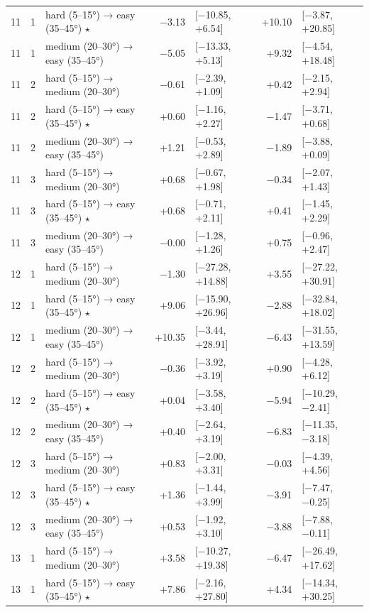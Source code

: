 \begin{table}[htbp]
\begin{tabular}{rllrlrl}
    11 & 1 & hard (5–15°) → easy (35–45°) $\star$ & −3.13 & [−10.85, +6.54] & +10.10 & [−3.87, +20.85] \\
    11 & 1 & medium (20–30°) → easy (35–45°) & −5.05 & [−13.33, +5.13] & +9.32 & [−4.54, +18.48] \\
    11 & 2 & hard (5–15°) → medium (20–30°) & −0.61 & [−2.39, +1.09] & +0.42 & [−2.15, +2.94] \\
    11 & 2 & hard (5–15°) → easy (35–45°) $\star$ & +0.60 & [−1.16, +2.27] & −1.47 & [−3.71, +0.68] \\
    11 & 2 & medium (20–30°) → easy (35–45°) & +1.21 & [−0.53, +2.89] & −1.89 & [−3.88, +0.09] \\
    11 & 3 & hard (5–15°) → medium (20–30°) & +0.68 & [−0.67, +1.98] & −0.34 & [−2.07, +1.43] \\
    11 & 3 & hard (5–15°) → easy (35–45°) $\star$ & +0.68 & [−0.71, +2.11] & +0.41 & [−1.45, +2.29] \\
    11 & 3 & medium (20–30°) → easy (35–45°) & −0.00 & [−1.28, +1.26] & +0.75 & [−0.96, +2.47] \\
    12 & 1 & hard (5–15°) → medium (20–30°) & −1.30 & [−27.28, +14.88] & +3.55 & [−27.22, +30.91] \\
    12 & 1 & hard (5–15°) → easy (35–45°) $\star$ & +9.06 & [−15.90, +26.96] & −2.88 & [−32.84, +18.02] \\
    12 & 1 & medium (20–30°) → easy (35–45°) & +10.35 & [−3.44, +28.91] & −6.43 & [−31.55, +13.59] \\
    12 & 2 & hard (5–15°) → medium (20–30°) & −0.36 & [−3.92, +3.19] & +0.90 & [−4.28, +6.12] \\
    12 & 2 & hard (5–15°) → easy (35–45°) $\star$ & +0.04 & [−3.58, +3.40] & −5.94 & [−10.29, −2.41] \\
    12 & 2 & medium (20–30°) → easy (35–45°) & +0.40 & [−2.64, +3.19] & −6.83 & [−11.35, −3.18] \\
    12 & 3 & hard (5–15°) → medium (20–30°) & +0.83 & [−2.00, +3.31] & −0.03 & [−4.39, +4.56] \\
    12 & 3 & hard (5–15°) → easy (35–45°) $\star$ & +1.36 & [−1.44, +3.99] & −3.91 & [−7.47, −0.25] \\
    12 & 3 & medium (20–30°) → easy (35–45°) & +0.53 & [−1.92, +3.10] & −3.88 & [−7.88, −0.11] \\
    13 & 1 & hard (5–15°) → medium (20–30°) & +3.58 & [−10.27, +19.38] & −6.47 & [−26.49, +17.62] \\
    13 & 1 & hard (5–15°) → easy (35–45°) $\star$ & +7.86 & [−2.16, +27.80] & +4.34 & [−14.34, +30.25] \\

\end{tabular}
\end{table}
